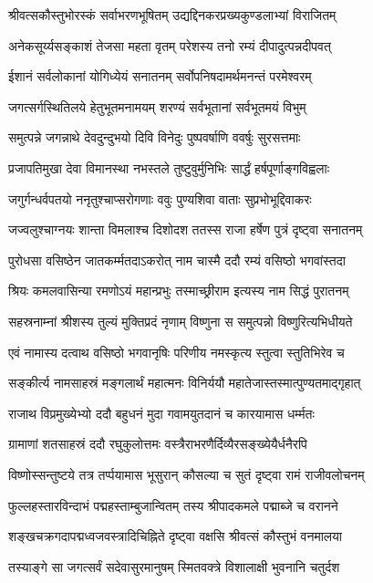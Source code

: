 \twolineshloka
{श्रीवत्सकौस्तुभोरस्कं सर्वाभरणभूषितम्}
{उद्यद्दिनकरप्रख्यकुण्डलाभ्यां विराजितम्}%

\twolineshloka
{अनेकसूर्य्यसङ्काशं तेजसा महता वृतम्}
{परेशस्य तनो रम्यं दीपादुत्पन्नदीपवत्}%

\twolineshloka
{ईशानं सर्वलोकानां योगिध्येयं सनातनम्}
{सर्वोपनिषदामर्थमनन्तं परमेश्वरम्}%

\twolineshloka
{जगत्सर्गस्थितिलये हेतुभूतमनामयम्}
{शरण्यं सर्वभूतानां सर्वभूतमयं विभुम्}%

\twolineshloka
{समुत्पन्ने जगन्नाथे देवदुन्दुभयो दिवि}
{विनेदुः पुष्पवर्षाणि ववर्षुः सुरसत्तमाः}%

\twolineshloka
{प्रजापतिमुखा देवा विमानस्था नभस्तले}
{तुष्टुवुर्मुनिभिः सार्द्धं हर्षपूर्णाङ्गविह्वलाः}%

\twolineshloka
{जगुर्गन्धर्वपतयो ननृतुश्चाप्सरोगणाः}
{ववुः पुण्यशिवा वाताः सुप्रभोभूद्दिवाकरः}%

\twolineshloka
{जज्वलुश्चाग्नयः शान्ता विमलाश्च दिशोदश}
{ततस्स राजा हर्षेण पुत्रं दृष्ट्वा सनातनम्}%

\twolineshloka
{पुरोधसा वसिष्ठेन जातकर्म्मतदाऽकरोत्}
{नाम चास्मै ददौ रम्यं वसिष्ठो भगवांस्तदा}%

\twolineshloka
{श्रियः कमलवासिन्या रमणोऽयं महान्प्रभुः}
{तस्माच्छ्रीराम इत्यस्य नाम सिद्धं पुरातनम्}%

\twolineshloka
{सहस्रनाम्नां श्रीशस्य तुल्यं मुक्तिप्रदं नृणाम्}
{विष्णुना स समुत्पन्नो विष्णुरित्यभिधीयते}%

\twolineshloka
{एवं नामास्य दत्वाथ वसिष्ठो भगवानृषिः}
{परिणीय नमस्कृत्य स्तुत्वा स्तुतिभिरेव च}%

\twolineshloka
{सङ्कीर्त्य नामसाहस्रं मङ्गलार्थं महात्मनः}
{विनिर्ययौ महातेजास्तस्मात्पुण्यतमाद्गृहात्}%

\twolineshloka
{राजाथ विप्रमुख्येभ्यो ददौ बहुधनं मुदा}
{गवामयुतदानं च कारयामास धर्म्मतः}%

\twolineshloka
{ग्रामाणां शतसाहस्रं ददौ रघुकुलोत्तमः}
{वस्त्रैराभरणैर्दिव्यैरसङ्ख्येयैर्धनैरपि}%

\twolineshloka
{विष्णोस्सन्तुष्टये तत्र तर्प्पयामास भूसुरान्}
{कौसल्या च सुतं दृष्ट्वा रामं राजीवलोचनम्}%

\twolineshloka
{फुल्लहस्तारविन्दाभं पद्महस्ताम्बुजान्वितम्}
{तस्य श्रीपादकमले पद्माब्जे च वरानने}%

\twolineshloka
{शङ्खचक्रगदापद्मध्वजवस्त्रादिचिह्निते}
{दृष्ट्वा वक्षसि श्रीवत्सं कौस्तुभं वनमालया}%

\twolineshloka
{तस्याङ्गे सा जगत्सर्वं सदेवासुरमानुषम्}
{स्मितवक्त्रे विशालाक्षी भुवनानि चतुर्दश}%

